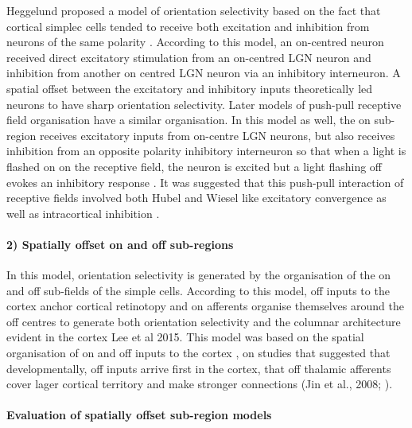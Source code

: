 Heggelund proposed a model of orientation selectivity based on the fact that cortical simplec cells tended to receive both excitation and inhibition from neurons of the same polarity \cite{Heggelund1981}. According to this model, an on-centred neuron received direct excitatory stimulation from an on-centred LGN neuron and inhibition from another on centred LGN neuron via an inhibitory interneuron. A spatial offset between the excitatory and inhibitory inputs theoretically led neurons to have sharp orientation selectivity. Later models of push-pull receptive field organisation have a similar organisation. In this model as well, the on sub-region receives excitatory inputs from on-centre LGN neurons, but also receives inhibition from an opposite polarity inhibitory interneuron so that when a light is flashed on on the receptive field, the neuron is excited but a light flashing off evokes an inhibitory response \cite{Palmer1981, Martinez2005, Kremkow2016}. It was suggested that this push-pull interaction of receptive fields involved both Hubel and Wiesel like excitatory convergence as well as intracortical inhibition \cite{Martinez2005, Kremkow2016}. 

\paragraph{2) Spatially offset on and off sub-regions}

In this model, orientation selectivity is generated by the organisation of the on and off sub-fields of the simple cells. According to this model, off inputs to the cortex anchor cortical retinotopy and on afferents organise themselves around the off centres to generate both orientation selectivity and the columnar architecture evident in the cortex \cite{Kremkow2016a} Lee et al 2015. This model was based on the spatial organisation of on and off inputs to the cortex \cite{Jin2011a, Kremkow2016a}, on studies that suggested that developmentally, off inputs arrive first in the cortex, that off thalamic afferents cover lager cortical territory and make stronger connections (Jin et al., 2008; \cite{Jin2011a}).


\paragraph{Evaluation of spatially offset sub-region models}

